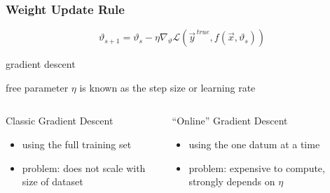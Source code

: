 \documentclass[
  aspectratio=1610, %
  intlimits %
]{beamer}
\begin{document}
 \begin{frame}
 \frametitle{Weight Update Rule}

 \begin{equation*}
\vartheta_{s+1} = \vartheta_{s} - \eta \nabla_{\vartheta}\mathcal{L}( \vec{y}^{\,true}, f(\vec{x}, \vartheta_{s}))
\end{equation*}

\begin{exampleblock}{gradient descent}
  \begin{center}
    free parameter $\eta$ is known as the step size or learning rate
  \end{center}
\end{exampleblock}

\begin{columns}
  \begin{column}{.45\textwidth}
    \begin{alertblock}{Classic Gradient Descent}
    \begin{itemize}
    \item using the full training set
    \item problem: does not scale with size of dataset
    \end{itemize}
  \end{alertblock}
\end{column}

\begin{column}{.45\textwidth}

  \begin{alertblock}{``Online'' Gradient Descent}
    \begin{itemize}
    \item using the one datum at a time
    \item problem: expensive to compute, strongly depends on $\eta$
    \end{itemize}
  \end{alertblock}

  \end{column}
\end{columns}

\end{frame}
\end{document}
